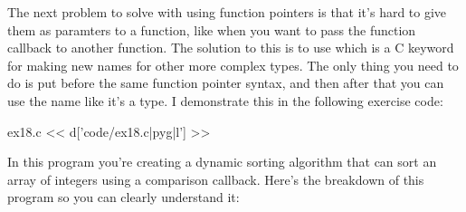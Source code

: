 The next problem to solve with using function pointers is that it's hard to
give them as paramters to a function, like when you want to pass the function
callback to another function.  The solution to this is to use 
which is a C keyword for making new names for other more complex types.
The only thing you need to do is put  before the same 
function pointer syntax, and then after that you can use the name like
it's a type.  I demonstrate this in the following exercise code:

\begin{code}{ex18.c}
<< d['code/ex18.c|pyg|l'] >>
\end{code}

In this program you're creating a dynamic sorting algorithm that can sort
an array of integers using a comparison callback.  Here's the breakdown
of this program so you can clearly understand it:

